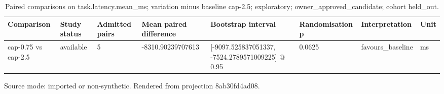 {
\begin{table}[htbp]
\centering
\caption{Paired comparisons on task.latency.mean\_ms; variation minus baseline cap-2.5; exploratory; owner\_approved\_candidate; cohort held\_out.}
\label{tab:traffictwin-statistical-study-8ab30fd4ad08}
\small
\renewcommand{\arraystretch}{1.15}
\begin{tabular}{llllllll}
\hline
Comparison & Study status & Admitted pairs & Mean paired difference & Bootstrap interval & Randomisation p & Interpretation & Unit \\
\hline
cap-0.75 vs cap-2.5 & available & 5 & -8310.90239707613 & [-9097.525837051337, -7524.2789571009225] @ 0.95 & 0.0625 & favours\_baseline & ms \\
\hline
\end{tabular}
\par\footnotesize
Source mode: imported or non-synthetic.
Rendered from projection 8ab30fd4ad08.
\end{table}
}
